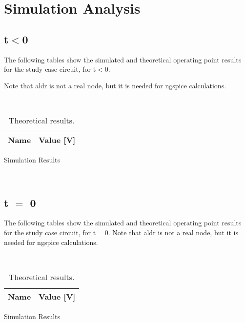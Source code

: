 \section{Simulation Analysis}
\label{sec:simulation analysis}
\subsection{t$<$0}


The following tables show the simulated and theoretical operating point results for the study case circuit, for t$<$0.

Note that aldr is not a real node, but it is needed for ngspice calculations.

\vspace{0.5cm}
\begin{table}[!htb]
    \begin{minipage}{0.50\textwidth}~
        \centering
        \begin{tabular}{|l|r|}
        {\bf Name} & {\bf Value [V]} \\ \hline
        
      \end{tabular}
      \caption{Simulation Results}
     \end{minipage}%
     \begin{minipage}{0.50\textwidth}~
       \centering
       \vspace{0.62cm}
       \caption{Theoretical results.}
     \end{minipage}
     \label{tab:t0}
\end{table}

\subsection{t $=$ 0}
\label{sec:3.2}

The following tables show the simulated and theoretical operating point results for the study case circuit, for t$=$0. Note that aldr is not a real node, but it is needed for ngspice calculations.


\begin{table}[!htb]
    \begin{minipage}{0.50\textwidth}~
        \centering
        \begin{tabular}{|l|r|}
        {\bf Name} & {\bf Value [V]} \\ \hline
        
      \end{tabular}
      \caption{Simulation Results}
     \end{minipage}%
     \begin{minipage}{0.50\textwidth}~
       \centering
       \vspace{0.62cm}
       \caption{Theoretical results.}
     \end{minipage}
     \label{tab:t0}
\end{table}


